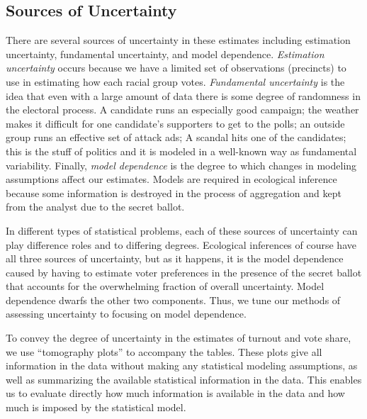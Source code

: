 \documentclass[12pt]{article}
\begin{document}
\subsection{Sources of Uncertainty}

There are several sources of uncertainty in these estimates including
estimation uncertainty, fundamental uncertainty, and model dependence.
\emph{Estimation uncertainty} occurs because we have a limited set of
observations (precincts) to use in estimating how each racial group
votes.  \emph{Fundamental uncertainty} is the idea that even with a
large amount of data there is some degree of randomness in the
electoral process. A candidate runs an especially good campaign; the
weather makes it difficult for one candidate's supporters to get to
the polls; an outside group runs an effective set of attack ads; A
scandal hits one of the candidates; this is the stuff of politics and
it is modeled in a well-known way as fundamental variability.
Finally, \emph{model dependence} is the degree to which changes in
modeling assumptions affect our estimates.  Models are required in
ecological inference because some information is destroyed in the
process of aggregation and kept from the analyst due to the secret
ballot.

In different types of statistical problems, each of these sources of
uncertainty can play difference roles and to differing degrees.
Ecological inferences of course have all three sources of uncertainty,
but as it happens, it is the model dependence caused by having to
estimate voter preferences in the presence of the secret ballot that
accounts for the overwhelming fraction of overall uncertainty.  Model
dependence dwarfs the other two components. Thus, we tune our methods
of assessing uncertainty to focusing on model dependence.  

To convey the degree of uncertainty in the estimates of turnout and
vote share, we use ``tomography plots'' to accompany the tables.
These plots give all information in the data without making any
statistical modeling assumptions, as well as summarizing the available
statistical information in the data. This enables us to evaluate
directly how much information is available in the data and how much
is imposed by the statistical model.
\end{document}

